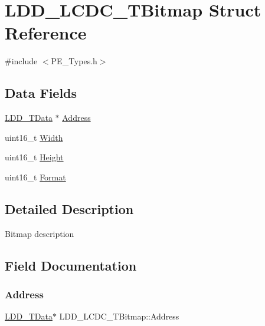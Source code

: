 \hypertarget{struct_l_d_d___l_c_d_c___t_bitmap}{}\section{L\+D\+D\+\_\+\+L\+C\+D\+C\+\_\+\+T\+Bitmap Struct Reference}
\label{struct_l_d_d___l_c_d_c___t_bitmap}


{\ttfamily \#include $<$P\+E\+\_\+\+Types.\+h$>$}

\subsection*{Data Fields}
\begin{DoxyCompactItemize}
\item 
\hyperlink{group___p_e___types__module_gade8ef9401405bd941b6da738b807f980}{L\+D\+D\+\_\+\+T\+Data} $\ast$ \hyperlink{struct_l_d_d___l_c_d_c___t_bitmap_a5501acee73fa929201a06eccc4821a7a}{Address}
\item 
uint16\+\_\+t \hyperlink{struct_l_d_d___l_c_d_c___t_bitmap_af88017bd29e49292265c1fda6dc5463d}{Width}
\item 
uint16\+\_\+t \hyperlink{struct_l_d_d___l_c_d_c___t_bitmap_a13fea31674709c4f681e6c86d3b71206}{Height}
\item 
uint16\+\_\+t \hyperlink{struct_l_d_d___l_c_d_c___t_bitmap_a8f886a6ce6e67d4b070c20bdd5ce495a}{Format}
\end{DoxyCompactItemize}


\subsection{Detailed Description}
Bitmap description 

\subsection{Field Documentation}
\mbox{\label{struct_l_d_d___l_c_d_c___t_bitmap_a5501acee73fa929201a06eccc4821a7a}} 
\subsubsection{\texorpdfstring{Address}{Address}}
{\footnotesize\ttfamily \hyperlink{group___p_e___types__module_gade8ef9401405bd941b6da738b807f980}{L\+D\+D\+\_\+\+T\+Data}$\ast$ L\+D\+D\+\_\+\+L\+C\+D\+C\+\_\+\+T\+Bitmap\+::\+Address}

